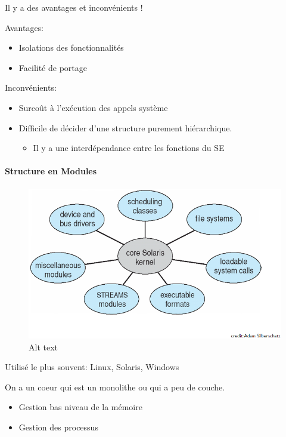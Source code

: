 Il y a des avantages et inconvénients !

Avantages:

\begin{itemize}
\tightlist
\item
  Isolations des fonctionnalités
\item
  Facilité de portage
\end{itemize}

Inconvénients:

\begin{itemize}
\tightlist
\item
  Surcoût à l'exécution des appels système
\item
  Difficile de décider d'une structure purement hiérarchique.

  \begin{itemize}
  \tightlist
  \item
    Il y a une interdépendance entre les fonctions du SE
  \end{itemize}
\end{itemize}

\paragraph{Structure en Modules}\label{structure-en-modules}

\begin{figure}
\centering
\includegraphics{image-20.png}
\caption{Alt text}
\end{figure}

Utilisé le plus souvent: Linux, Solaris, Windows

On a un coeur qui est un monolithe ou qui a peu de couche.

\begin{itemize}
\tightlist
\item
  Gestion bas niveau de la mémoire
\item
  Gestion des processus
\end{itemize}

